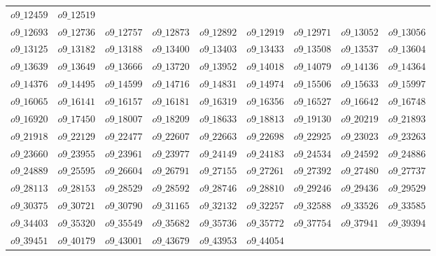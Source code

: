 \documentclass{amsart} %
\theoremstyle{thm}
\theoremstyle{definition}
\numberwithin{equation}{section}
\begin{document}
\begin{table}[htbp]
{\begin{tabular}{ccccccccc}
 $o9\_12459$&
 $o9\_12519$\\
 $o9\_12693$&
 $o9\_12736$&
 $o9\_12757$&
 $o9\_12873$&
 $o9\_12892$&
 $o9\_12919$&
 $o9\_12971$&
 $o9\_13052$&
 $o9\_13056$\\
 $o9\_13125$&
 $o9\_13182$&
 $o9\_13188$&
 $o9\_13400$&
 $o9\_13403$&
 $o9\_13433$&
 $o9\_13508$&
 $o9\_13537$&
 $o9\_13604$\\
 $o9\_13639$&
 $o9\_13649$&
 $o9\_13666$&
 $o9\_13720$&
 $o9\_13952$&
 $o9\_14018$&
 $o9\_14079$&
 $o9\_14136$&
 $o9\_14364$\\
 $o9\_14376$&
 $o9\_14495$&
 $o9\_14599$&
 $o9\_14716$&
 $o9\_14831$&
 $o9\_14974$&
 $o9\_15506$&
 $o9\_15633$&
 $o9\_15997$\\
 $o9\_16065$&
 $o9\_16141$&
 $o9\_16157$&
 $o9\_16181$&
 $o9\_16319$&
 $o9\_16356$&
 $o9\_16527$&
 $o9\_16642$&
 $o9\_16748$\\
 $o9\_16920$&
 $o9\_17450$&
 $o9\_18007$&
 $o9\_18209$&
 $o9\_18633$&
 $o9\_18813$&
 $o9\_19130$&
 $o9\_20219$&
 $o9\_21893$\\
 $o9\_21918$&
 $o9\_22129$&
 $o9\_22477$&
 $o9\_22607$& 
 $o9\_22663$&
 $o9\_22698$&
 $o9\_22925$&
 $o9\_23023$&
 $o9\_23263$\\
 $o9\_23660$&
 $o9\_23955$&
 $o9\_23961$&
 $o9\_23977$&
 $o9\_24149$&
 $o9\_24183$&
 $o9\_24534$&
 $o9\_24592$&
 $o9\_24886$\\
 $o9\_24889$&
 $o9\_25595$&
 $o9\_26604$&
 $o9\_26791$&
 $o9\_27155$&
 $o9\_27261$&
 $o9\_27392$&
 $o9\_27480$&
 $o9\_27737$\\
 $o9\_28113$&
 $o9\_28153$&
 $o9\_28529$&
 $o9\_28592$&
 $o9\_28746$&
 $o9\_28810$&
 $o9\_29246$&
 $o9\_29436$&
 $o9\_29529$\\
 $o9\_30375$&
 $o9\_30721$&
 $o9\_30790$&
 $o9\_31165$&
 $o9\_32132$&
 $o9\_32257$&
 $o9\_32588$&
 $o9\_33526$&
 $o9\_33585$\\
 $o9\_34403$&
 $o9\_35320$&
 $o9\_35549$&
 $o9\_35682$&
 $o9\_35736$&
 $o9\_35772$&
 $o9\_37754$&
 $o9\_37941$&
 $o9\_39394$\\
 $o9\_39451$&
 $o9\_40179$&
 $o9\_43001$&
 $o9\_43679$&
 $o9\_43953$&
 $o9\_44054$&&&\\
 \bottomrule
	\end{tabular}
}
\end{table}
 
\end{document}
